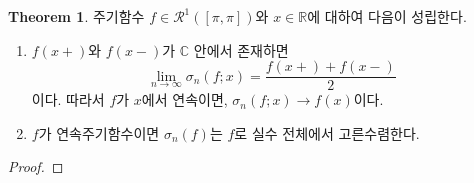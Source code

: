 \documentclass[11pt]{book}
\numberwithin{equation}{chapter}
\def\RR{\mathbb{R}}
\def\CC{\mathbb{C}}
\def\calR{\mathcal{R}}
\theoremstyle{definition}
\newtheorem{thm}{Theorem}[section]
\newenvironment{enum}
	{\begin{enumerate}[label=(\alph*), leftmargin=2\parindent]}
	{\end{enumerate}}
\begin{document}
\begin{thm} \label{15.2.9}
    주기함수 \(f \in \calR^1([\pi, \pi])\)와 \(x \in \RR\)에 대하여 다음이 성립한다.
    \begin{enum}
        \item \(f(x+)\)와 \(f(x-)\)가 \(\CC\) 안에서 존재하면
        \[
            \lim_{n \to \infty} \sigma_n(f; x) = \frac{f(x+) + f(x-)}{2}
        \]
        이다. 따라서 \(f\)가 \(x\)에서 연속이면, \(\sigma_n(f ; x) \to f(x)\)이다.
        \item \(f\)가 연속주기함수이면 \(\sigma_n(f)\)는 \(f\)로 실수 전체에서 고른수렴한다.
    \end{enum}
\end{thm}

\begin{proof}
    \quad


\end{proof}
\end{document}
